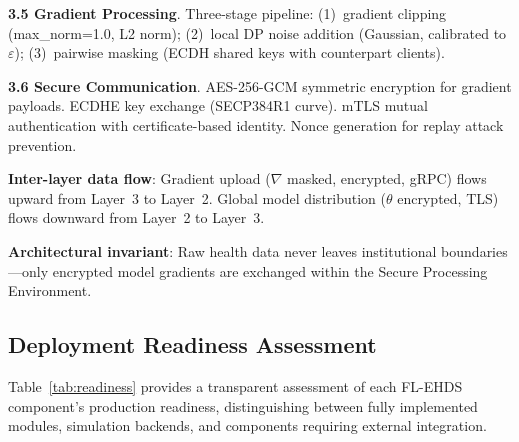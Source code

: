 \documentclass[conference,a4paper]{IEEEtran}
\begin{document}
\textbf{3.5 Gradient Processing}. Three-stage pipeline: (1)~gradient clipping (max\_norm=1.0, L2 norm); (2)~local DP noise addition (Gaussian, calibrated to $\varepsilon$); (3)~pairwise masking (ECDH shared keys with counterpart clients).

\textbf{3.6 Secure Communication}. AES-256-GCM symmetric encryption for gradient payloads. ECDHE key exchange (SECP384R1 curve). mTLS mutual authentication with certificate-based identity. Nonce generation for replay attack prevention.

\textbf{Inter-layer data flow}: Gradient upload ($\nabla$ masked, encrypted, gRPC) flows upward from Layer~3 to Layer~2. Global model distribution ($\theta$ encrypted, TLS) flows downward from Layer~2 to Layer~3.

\textbf{Architectural invariant}: Raw health data never leaves institutional boundaries---only encrypted model gradients are exchanged within the Secure Processing Environment.

\subsection{Deployment Readiness Assessment}

Table~\ref{tab:readiness} provides a transparent assessment of each FL-EHDS component's production readiness, distinguishing between fully implemented modules, simulation backends, and components requiring external integration.
\end{document}
